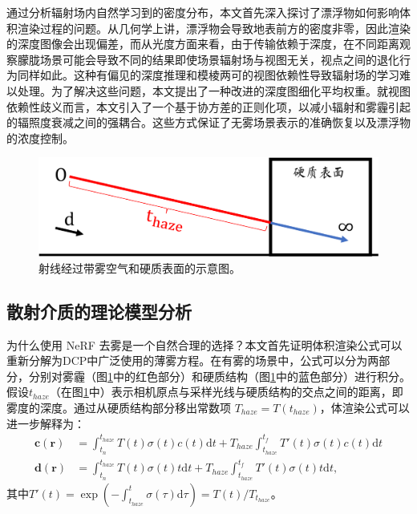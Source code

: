 通过分析辐射场内自然学习到的密度分布，本文首先深入探讨了漂浮物如何影响体积渲染过程的问题。从几何学上讲，漂浮物会导致地表前方的密度非零，因此渲染的深度图像会出现偏差，而从光度方面来看，由于传输依赖于深度，在不同距离观察朦胧场景可能会导致不同的结果即使场景辐射场与视图无关，视点之间的退化行为同样如此。这种有偏见的深度推理和模棱两可的视图依赖性导致辐射场的学习难以处理。为了解决这些问题，本文提出了一种改进的深度图细化平均权重。就视图依赖性歧义而言，本文引入了一个基于协方差的正则化项，以减小辐射和雾霾引起的辐照度衰减之间的强耦合。这些方式保证了无雾场景表示的准确恢复以及漂浮物的浓度控制。

\begin{figure}[ht]
    \centering
    \includegraphics[width=\textwidth]{undergraduate-thesis/images/dehazing-nerf/t-haze.pdf}
    \caption{射线经过带雾空气和硬质表面的示意图。}
    \label{fig:dehazing-nerf t-haze decomposition}
\end{figure}

\subsection{散射介质的理论模型分析}
为什么使用 NeRF 去雾是一个自然合理的选择？本文首先证明体积渲染公式可以重新分解为DCP\cite{kaiming_he_single_2009}中广泛使用的薄雾方程。在有雾的场景中，公式可以分为两部分，分别对雾霾（图\ref{fig:dehazing-nerf t-haze decomposition}中的红色部分）和硬质结构（图\ref{fig:dehazing-nerf t-haze decomposition}中的蓝色部分）进行积分。假设$t_{haze}$（在图\ref{fig:dehazing-nerf t-haze decomposition}中）表示相机原点与采样光线与硬质结构的交点之间的距离，即雾度的深度。通过从硬质结构部分移出常数项 $T_{haze} = T(t_{haze})$，体渲染公式可以进一步解释为：
\begin{align}
    \textbf{c}(\textbf{r}) &= \int_{t_n}^{t_{haze}}T(t)\sigma(t)c(t)\text{d}t + T_{haze}\int_{t_{haze}}^{t_f}T'(t)\sigma(t)c(t)\text{d}t\\
    \textbf{d}(\textbf{r}) &= \int_{t_n}^{t_{haze}}T(t)\sigma(t)t\text{d}t + T_{haze}\int_{t_{haze}}^{t_f}T'(t)\sigma(t)t\text{d}t,
\end{align}
其中$T'(t)=\exp(-\int_{t_{haze}}^{t}\sigma(\tau)\text{d}\tau)=T(t)/T_{t_{haze}}$。


